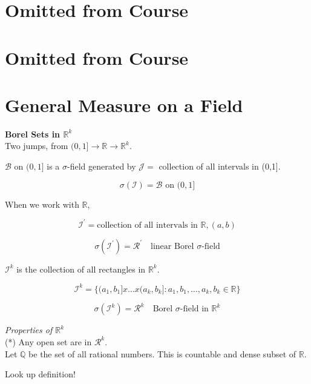 \documentclass[11pt,fleqn]{book} %
\begin{document}
\section{Omitted from Course}

\section{Omitted from Course}

\section{General Measure on a Field}






\textbf{Borel Sets in $\mathbb{R}^k$}\\

Two jumps, from $(0,1] \rightarrow \mathbb{R} \rightarrow \mathbb{R}^k$.

$\mathcal{B} \text{ on } (0,1]$ is a $\sigma$-field generated by $\mathcal{J} = $ collection of all intervals in (0,1].

	$$\sigma(\mathcal{I}) = \mathcal{B} \text{ on } (0,1]$$

When we work with $\mathbb{R}$, 

$$\mathcal{I}^\prime = \text{collection of all intervals in } \mathbb{R}, (a,b) $$

$$\sigma(\mathcal{I}^\prime) = \mathcal{R}^\prime \quad \text{linear Borel }\sigma\text{-field} $$


$\mathcal{I}^k $ is the collection of all rectangles in $\mathbb{R}^k$.

$$ \mathcal{I}^k = \{(a_1, b_1]x \dots x(a_k, b_k]: a_1, b_1, \dots, a_k, b_k \in \mathbb{R} \}$$

$$\sigma(\mathcal{I}^k) = \mathcal{R}^k \quad \text{Borel } \sigma\text{-field in } \mathbb{R}^k$$

\textit{Properties of $\mathbb{R}^k$}\\

(*) Any open set are in $\mathcal{R}^k$.\\

Let $\mathbb{Q}$ be the set of all rational numbers. This is countable and dense subset of $\mathbb{R}$. \\

\begin{definition}[Dense]
	Look up definition!
\end{definition}
\end{document}
